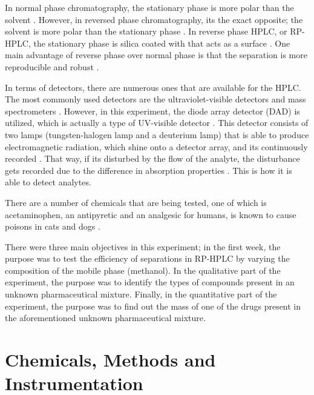 \documentclass[a4paper, 12pt]{article}
\begin{document}
In normal phase chromatography, the stationary phase is more polar than the solvent \cite{harris}. However, in reversed phase chromatography, its the exact opposite; the solvent is more polar than the stationary phase \cite{harris}. In reverse phase HPLC, or RP-HPLC, the stationary phase is silica coated with  that acts as a surface \cite{fanali_liquid_2013}. One main advantage of reverse phase over normal phase is that the separation is more reproducible and robust \cite{fanali_liquid_2013}.

In terms of detectors, there are numerous ones that are available for the HPLC. The most commonly used detectors are the ultraviolet-visible detectors and mass spectrometers \cite{vitha_chromatography:_2017}. However, in this experiment, the diode array detector (DAD) is utilized, which is actually a type of UV-visible detector \cite{vitha_chromatography:_2017}. This detector consists of two lamps (tungsten-halogen lamp and a deuterium lamp) that is able to produce electromagnetic radiation, which shine onto a detector array, and its continuously recorded  \cite{vitha_chromatography:_2017}. That way, if its disturbed by the flow of the analyte, the disturbance gets recorded due to the difference in absorption properties \cite{vitha_chromatography:_2017}. This is how it is able to detect analytes.

There are a number of chemicals that are being tested, one of which is acetaminophen, an antipyretic and an analgesic for humans, is known to cause poisons in cats and dogs \cite{dogs-cats}.

There were three main objectives in this experiment; in the first week, the purpose was to test the efficiency of separations in RP-HPLC by varying the composition of the mobile phase (methanol). In the qualitative part of the experiment, the purpose was to identify the types of compounds present in an unknown pharmaceutical mixture. Finally, in the quantitative part of the experiment, the purpose was to find out the mass of one of the drugs present in the aforementioned unknown pharmaceutical mixture.


\section{Chemicals, Methods and Instrumentation}
\end{document}
